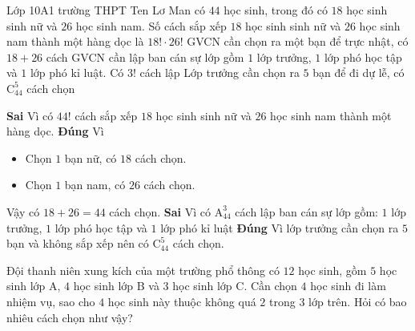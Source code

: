 \begin{ex}%
	Lớp 10A1 trường THPT Ten Lơ Man có $44$ học sinh, trong đó có $18$ học sinh sinh nữ và $26$ học sinh nam.
	\choiceTF 
	{Số cách sắp xếp $18$ học sinh sinh nữ và $26$ học sinh nam thành một hàng dọc là $18!\cdot 26!$}
	{\True GVCN cần chọn ra một bạn để trực nhật, có $18+26$ cách}
	{GVCN cần lập ban cán sự lớp gồm $1$ lớp trưởng, $1$ lớp phó học tập và $1$ lớp phó kỉ luật. Có $3!$ cách lập}
	{\True Lớp trưởng cần chọn ra $5$ bạn để đi dự lễ, có $\mathrm{C}_{44}^5$ cách chọn}
	\loigiai 
	{
		\begin{itemchoice}
			\itemch \textbf{Sai} Vì có $44!$ cách sắp xếp $18$ học sinh sinh nữ và $26$ học sinh nam thành một hàng dọc.
			\itemch \textbf{Đúng} Vì
			\begin{itemize}
			\item Chọn $1$ bạn nữ, có $18$ cách chọn.
			\item Chọn $1$ bạn nam, có $26$ cách chọn.
			\end{itemize}
			Vậy có $18+26=44$ cách chọn.
			\itemch \textbf{Sai} Vì  có $\mathrm{A}_{44}^3$ cách lập ban cán sự lớp gồm: $1$ lớp trưởng, $1$ lớp phó học tập và $1$ lớp phó kỉ luật
			\itemch \textbf{Đúng} Vì lớp trưởng cần chọn ra $5$ bạn và không sắp xếp nên có $\mathrm{C}_{44}^5$ cách chọn.
		\end{itemchoice}	
	}
\end{ex}

\begin{bt}%
	Đội thanh niên xung kích của một trường phổ thông có $12$ học sinh, gồm $5$ học sinh lớp A, $4$ học sinh lớp B và $3$ học sinh lớp  C. Cần chọn $4$ học sinh đi làm nhiệm vụ, sao cho $4$ học sinh này thuộc không quá $2$ trong $3$ lớp trên. Hỏi có bao nhiêu cách chọn như vậy?
\end{bt}

